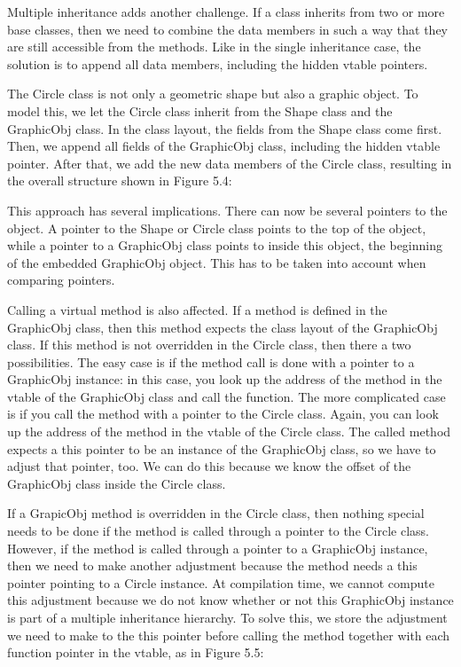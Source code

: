 
Multiple inheritance adds another challenge. If a class inherits from two or more base classes, then we need to combine the data members in such a way that they are still accessible from the methods. Like in the single inheritance case, the solution is to append all data members, including the hidden vtable pointers.

The Circle class is not only a geometric shape but also a graphic object. To model this, we let the Circle class inherit from the Shape class and the GraphicObj class. In the class layout, the fields from the Shape class come first. Then, we append all fields of the GraphicObj class, including the hidden vtable pointer. After that, we add the new data members of the Circle class, resulting in the overall structure shown in Figure 5.4:


This approach has several implications. There can now be several pointers to the object. A pointer to the Shape or Circle class points to the top of the object, while a pointer to a GraphicObj class points to inside this object, the beginning of the embedded GraphicObj object. This has to be taken into account when comparing pointers.

Calling a virtual method is also affected. If a method is defined in the GraphicObj class, then this method expects the class layout of the GraphicObj class. If this method is not overridden in the Circle class, then there a two possibilities. The easy case is if the method call is done with a pointer to a GraphicObj instance: in this case, you look up the address of the method in the vtable of the GraphicObj class and call the function. The more complicated case is if you call the method with a pointer to the Circle class. Again, you can look up the address of the method in the vtable of the Circle class. The called method expects a this pointer to be an instance of the GraphicObj class, so we have to adjust that pointer, too. We can do this because we know the offset of the GraphicObj class inside the Circle class.

If a GrapicObj method is overridden in the Circle class, then nothing special needs to be done if the method is called through a pointer to the Circle class. However, if the method is called through a pointer to a GraphicObj instance, then we need to make another adjustment because the method needs a this pointer pointing to a Circle instance. At compilation time, we cannot compute this adjustment because we do not know whether or not this GraphicObj instance is part of a multiple inheritance hierarchy. To solve this, we store the adjustment we need to make to the this pointer before calling the method together with each function pointer in the vtable, as in Figure 5.5:

